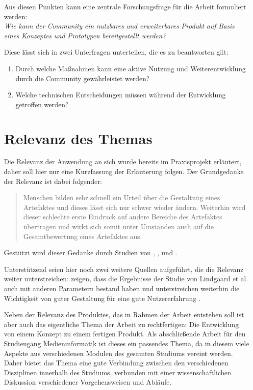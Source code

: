 Aus diesen Punkten kann eine zentrale Forschungsfrage für die Arbeit formuliert werden:\\
\textit{Wie kann der Community ein nutzbares und erweiterbares Produkt auf Basis eines Konzeptes und Prototypen bereitgestellt werden?}

Diese lässt sich in zwei Unterfragen unterteilen, die es zu beantworten gilt:

\begin{enumerate}
  \item Durch welche Maßnahmen kann eine aktive Nutzung und Weiterentwicklung durch die Community gewährleistet werden?
  \item Welche technischen Entscheidungen müssen während der Entwicklung getroffen werden?
\end{enumerate}

\section{Relevanz des Themas}
\label{sec:relevance}
Die Relevanz der Anwendung an sich wurde bereits im Praxisprojekt erläutert, daher soll hier nur eine Kurzfassung der Erläuterung folgen. Der Grundgedanke der Relevanz ist dabei folgender:
\begin{quote}
  Menschen bilden sehr schnell ein Urteil über die Gestaltung eines Artefaktes und dieses lässt sich nur schwer wieder ändern. Weiterhin wird dieser schlechte erste Eindruck auf andere Bereiche des Artefaktes übertragen und wirkt sich somit unter Umständen auch auf die Gesamtbewertung eines Artefaktes aus.
\end{quote}

Gestützt wird dieser Gedanke durch Studien von \cite{lindgaard2006attention}, \cite{campbell1996fitting}, und \cite{nickerson1998confirmation}.

Unterstützend seien hier noch zwei weitere Quellen aufgeführt, die die Relevanz weiter unterstreichen:
\cite{tractinsky2006evaluating} zeigen, dass die Ergebnisse der Studie von Lindgaard et al. auch mit anderen Parametern bestand haben und unterstreichen weiterhin die Wichtigkeit von guter Gestaltung für eine gute Nutzererfahrung \cite{tractinsky2000beautiful}.

Neben der Relevanz des Produktes, das in Rahmen der Arbeit entstehen soll ist aber auch das eigentliche Thema der Arbeit zu rechtfertigen: Die Entwicklung von einem Konzept zu einem fertigen Produkt.
Als abschließende Arbeit für den Studiengang Medieninformatik ist dieses ein passendes Thema, da in diesem viele Aspekte aus verschiedenen Modulen des gesamten Studiums vereint werden. Daher bietet das Thema eine gute Verbindung zwischen den verschiedenen Disziplinen innerhalb des Studiums, verbunden mit einer wissenschaftlichen Diskussion verschiedener Vorgehensweisen und Abläufe.

